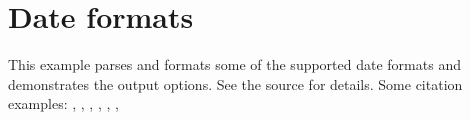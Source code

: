 \documentclass[a4paper]{article}
\begin{document}
\section*{Date formats}
This example parses and formats some of the supported date formats and
demonstrates the output options. See the source for details. Some citation
examples: \cite{date1}, \cite{date2}, \cite{date3}, \cite{date4},
\cite{date5}, \cite{date6}, \cite{date7}
\printbibliography[env=simple,title={Examples}]
\end{document}
